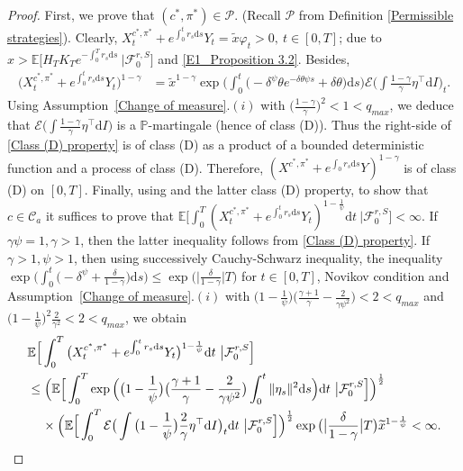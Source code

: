 \documentclass[12,reqno]{amsart}
\numberwithin{equation}{section}
\begin{document}
\begin{proof}
	First, we prove that $(c^{*},\pi^{*})\in\mathcal{P}$. (Recall $\mathcal{P}$ from Definition \ref{Permissible strategies}). Clearly, $X_{t}^{c^{*},\pi^{*}}+e^{\int_{0}^{t}r_{s}\mathrm{d}s}Y_{t}=\widetilde{x}\varphi_{t}>0,~t\in[0,T]$; due to $x>\mathbb{E}\big[H_{T}K_{T}e^{-\int_{0}^{T}r_{s}\mathrm{d}s}~\big|\mathcal{F}_{0}^{r,S}\big]$ and \eqref{E1_Proposition 3.2}. Besides,
	\begin{align}\label{Class (D) property}
		\big(X_{t}^{c^{*},\pi^{*}}+e^{\int_{0}^{t}r_{s}\mathrm{d}s}Y_{t}\big)^{1-\gamma}&=\widetilde{x}^{1-\gamma}\exp\Big(\int_{0}^{t}\big(-\delta^{\psi}\theta e^{-\delta\theta\psi s}+\delta\theta\big)\mathrm{d}s\Big)\mathcal{E} \big(\int\frac{1-\gamma}{\gamma}\eta^{\top}\mathrm{d}I\big)_{t}.
	\end{align}
	Using Assumption~\ref{Change of measure}$.(i)$ with $\big(\frac{1-\gamma}{\gamma}\big)^{2}<1<q_{max}$, we deduce that $\mathcal{E}\big(\int\frac{1-\gamma}{\gamma}\eta^{\top}\mathrm{d}I\big)$ is a $\mathbb{P}$-martingale (hence of class (D)). Thus the right-side of \eqref{Class (D) property} is of class (D) as a product of a bounded deterministic function and a process of class (D). Therefore, $(X^{c^{*},\pi^{*}}+e^{\int_{0}^{}r_{s}\mathrm{d}s}Y)^{1-\gamma}$ is of class (D) on $[0,T]$. Finally, using \cite[Prop.~2.2]{xing2017consumption} and the latter class (D) property, to show that $c\in\mathcal{C}_{a}$ it suffices to prove that $\mathbb{E}\big[\int_{0}^{T}(X_{t}^{c^{*},\pi^{*}}+e^{\int_{0}^{t}r_{s}\mathrm{d}s}Y_{t})^{1-\frac{1}{\psi}}\mathrm{d}t~\big|\mathcal{F}_{0}^{r,S}\big]<\infty$. If $\gamma\psi=1,\gamma>1$, then the latter inequality follows from \eqref{Class (D) property}. If $\gamma>1,\psi>1$, then using successively Cauchy-Schwarz inequality, the inequality $\exp\big(\int_{0}^{t}\big(-\delta^{\psi}+\frac{\delta}{1-\gamma}\big)\mathrm{d}s\big)\le\exp\big(\big|\frac{\delta}{1-\gamma}\big|T\big)$ for $t\in[0,T]$, Novikov condition and Assumption~\ref{Change of measure}$.(i)$ with $\big(1-\frac{1}{\psi}\big)\big(\frac{\gamma+1}{\gamma}-\frac{2}{\gamma\psi^{2}}\big)<2<q_{max}$ and $\big(1-\frac{1}{\psi}\big)^{2}\frac{2}{\gamma^{2}}<2<q_{max}$, we obtain
	\begin{align*}
		&\mathbb{E}\Big[\int_{0}^{T}\big(X_{t}^{c^{*},\pi^{*}}+e^{\int_{0}^{t}r_{s}\mathrm{d}s}Y_{t}\big)^{1-\frac{1}{\psi}}\mathrm{d}t~\big|\mathcal{F}_{0}^{r,S}\Big]\notag\\
		&\le\Big(\mathbb{E}\Big[\int_{0}^{T}\exp\Big(\big(1-\frac{1}{\psi}\big)\big(\frac{\gamma+1}{\gamma}-\frac{2}{\gamma\psi^{2}}\big)\int_{0}^{t}\|\eta_{s}\|^{2}\mathrm{d}s\Big)\mathrm{d}t~\big|\mathcal{F}_{0}^{r,S}\Big]\Big)^{\frac{1}{2}}\notag\\
		&\phantom{xx}\times\Big(\mathbb{E}\Big[\int_{0}^{T}\mathcal{E}\big(\int\big(1-\frac{1}{\psi}\big)\frac{2}{\gamma}\eta^{\top}\mathrm{d}I\big)_{t}\mathrm{d}t~\big|\mathcal{F}_{0}^{r,S}\Big]\Big)^{\frac{1}{2}}\exp\big(\big|\frac{\delta}{1-\gamma}\big|T\big)\widetilde{x}^{1-\frac{1}{\psi}}<\infty.
	\end{align*}
	

\end{proof}
\end{document}
